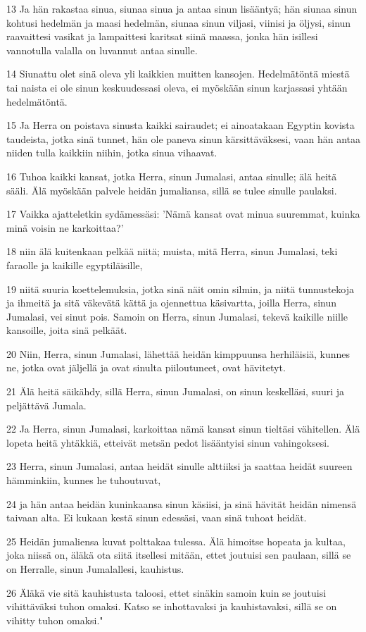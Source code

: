 \par 13 Ja hän rakastaa sinua, siunaa sinua ja antaa sinun lisääntyä; hän siunaa sinun kohtusi hedelmän ja maasi hedelmän, siunaa sinun viljasi, viinisi ja öljysi, sinun raavaittesi vasikat ja lampaittesi karitsat siinä maassa, jonka hän isillesi vannotulla valalla on luvannut antaa sinulle.
\par 14 Siunattu olet sinä oleva yli kaikkien muitten kansojen. Hedelmätöntä miestä tai naista ei ole sinun keskuudessasi oleva, ei myöskään sinun karjassasi yhtään hedelmätöntä.
\par 15 Ja Herra on poistava sinusta kaikki sairaudet; ei ainoatakaan Egyptin kovista taudeista, jotka sinä tunnet, hän ole paneva sinun kärsittäväksesi, vaan hän antaa niiden tulla kaikkiin niihin, jotka sinua vihaavat.
\par 16 Tuhoa kaikki kansat, jotka Herra, sinun Jumalasi, antaa sinulle; älä heitä sääli. Älä myöskään palvele heidän jumaliansa, sillä se tulee sinulle paulaksi.
\par 17 Vaikka ajatteletkin sydämessäsi: 'Nämä kansat ovat minua suuremmat, kuinka minä voisin ne karkoittaa?'
\par 18 niin älä kuitenkaan pelkää niitä; muista, mitä Herra, sinun Jumalasi, teki faraolle ja kaikille egyptiläisille,
\par 19 niitä suuria koettelemuksia, jotka sinä näit omin silmin, ja niitä tunnustekoja ja ihmeitä ja sitä väkevätä kättä ja ojennettua käsivartta, joilla Herra, sinun Jumalasi, vei sinut pois. Samoin on Herra, sinun Jumalasi, tekevä kaikille niille kansoille, joita sinä pelkäät.
\par 20 Niin, Herra, sinun Jumalasi, lähettää heidän kimppuunsa herhiläisiä, kunnes ne, jotka ovat jäljellä ja ovat sinulta piiloutuneet, ovat hävitetyt.
\par 21 Älä heitä säikähdy, sillä Herra, sinun Jumalasi, on sinun keskelläsi, suuri ja peljättävä Jumala.
\par 22 Ja Herra, sinun Jumalasi, karkoittaa nämä kansat sinun tieltäsi vähitellen. Älä lopeta heitä yhtäkkiä, etteivät metsän pedot lisääntyisi sinun vahingoksesi.
\par 23 Herra, sinun Jumalasi, antaa heidät sinulle alttiiksi ja saattaa heidät suureen hämminkiin, kunnes he tuhoutuvat,
\par 24 ja hän antaa heidän kuninkaansa sinun käsiisi, ja sinä hävität heidän nimensä taivaan alta. Ei kukaan kestä sinun edessäsi, vaan sinä tuhoat heidät.
\par 25 Heidän jumaliensa kuvat polttakaa tulessa. Älä himoitse hopeata ja kultaa, joka niissä on, äläkä ota siitä itsellesi mitään, ettet joutuisi sen paulaan, sillä se on Herralle, sinun Jumalallesi, kauhistus.
\par 26 Äläkä vie sitä kauhistusta taloosi, ettet sinäkin samoin kuin se joutuisi vihittäväksi tuhon omaksi. Katso se inhottavaksi ja kauhistavaksi, sillä se on vihitty tuhon omaksi."

